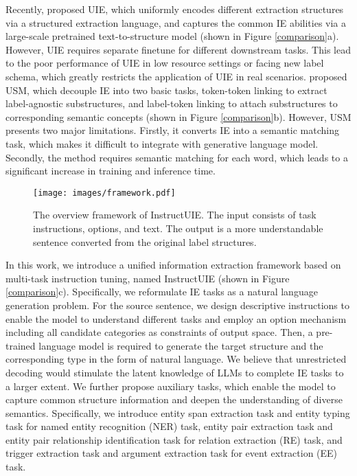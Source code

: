 Recently, \citet{UIE} proposed UIE, which uniformly encodes different extraction structures via a structured extraction language, and captures the common IE abilities via a large-scale pretrained text-to-structure model (shown in Figure \ref{comparison}a). However, UIE requires separate finetune for different downstream tasks. This lead to the poor performance of UIE in low resource settings or facing new label schema, which greatly restricts the application of UIE in real scenarios. 
\citet{USM} proposed USM, which decouple IE into two basic tasks, token-token linking to extract label-agnostic substructures, and label-token linking to attach substructures to corresponding semantic concepts (shown in Figure \ref{comparison}b). However, USM presents two major limitations. Firstly, it converts IE into a semantic matching task, which makes it difficult to integrate with generative language model. Secondly, the method requires semantic matching for each word, which leads to a significant increase in training and inference time.

\begin{figure*}[t]
\centering
  \texttt{[image: images/framework.pdf]}
  \caption{The overview framework of InstructUIE. The input consists of task instructions, options, and text. The output is a more understandable sentence converted from the original label structures.}
 \label{fig:framework}
\end{figure*}

In this work, we introduce a unified information extraction framework based on multi-task instruction tuning, named InstructUIE (shown in Figure \ref{comparison}c). Specifically, we reformulate IE tasks as a natural language generation problem. 
For the source sentence, we design descriptive instructions to enable the model to understand different tasks and employ an option mechanism including all candidate categories as constraints of output space. 
Then, a pre-trained language model is required to generate the target structure and the corresponding type in the form of natural language. 
We believe that unrestricted decoding would stimulate the latent knowledge of LLMs to complete IE tasks to a larger extent. 
We further propose auxiliary tasks, which enable the model to capture common structure information and deepen the understanding of diverse semantics. 
Specifically, we introduce entity span extraction task and entity typing task for named entity recognition (NER) task, entity pair extraction task and entity pair relationship identification task for relation extraction (RE) task, and trigger extraction task and argument extraction task for event extraction (EE) task. 

